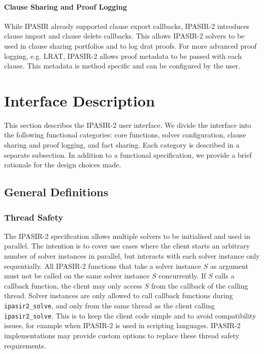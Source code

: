 \documentclass[sat]{iosart2x}
\begin{document}
\paragraph{Clause Sharing and Proof Logging}
While IPASIR already supported clause export callbacks, IPASIR-2 introduces clause import and clause delete callbacks.
This allows IPASIR-2 solvers to be used in clause sharing portfolios and to log drat proofs.
For more advanced proof logging, e.g. LRAT, IPASIR-2 allows proof metadata to be passed with each clause.
This metadata is method specific and can be configured by the user.

\section{Interface Description}

This section describes the IPASIR-2 user interface.
We divide the interface into the following functional categories: core functions, solver configuration, clause sharing and proof logging, and fact sharing.
Each category is described in a separate subsection.
In addition to a functional specification, we provide a brief rationale for the design choices made.

\subsection{General Definitions}

\subsubsection{Thread Safety}

The IPASIR-2 specification allows multiple solvers to be initialised and used in parallel.
The intention is to cover use cases where the client starts an arbitrary number of solver instances in parallel, but interacts with each solver instance only sequentially.
All IPASIR-2 functions that take a solver instance $S$ as argument must not be called on the same solver instance $S$ concurrently.
If $S$ calls a callback function, the client may only access $S$ from the callback of the calling thread.
Solver instances are only allowed to call callback functions during \texttt{ipasir2\_solve}, and only from the same thread as the client calling \texttt{ipasir2\_solve}.
This is to keep the client code simple and to avoid compatibility issues, for example when IPASIR-2 is used in scripting languages.
IPASIR-2 implementations may provide custom options to replace these thread safety requirements.
\end{document}
